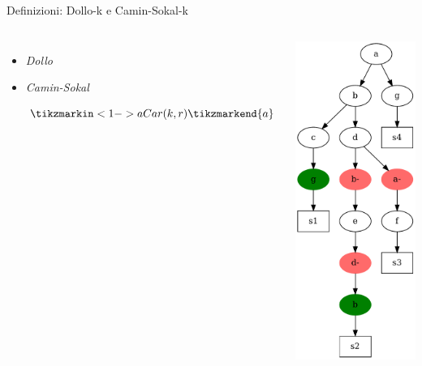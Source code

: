 \documentclass{beamer}
\begin{document}
\begin{tframe}{Definizioni: Dollo-k e Camin-Sokal-k}
  \begin{columns}
  \begin{itemize}
    \item \textit{Dollo}
    \item \textit{Camin-Sokal}

    \vspace{5mm}
    \begin{equation*}
      \tikzmarkin<1->{a}
        Car(k, r)
      \tikzmarkend{a}
    \end{equation*}
  \end{itemize}

  \includegraphics[scale = 0.23]{img/tree.pdf}
\end{columns}
\end{tframe}
\end{document}
